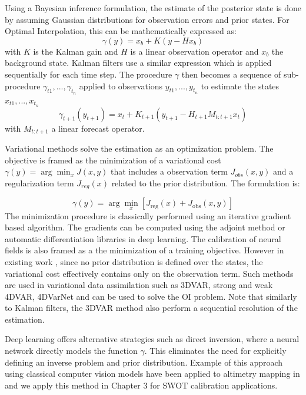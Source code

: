 \begin{bibunit}
Using a Bayesian inference formulation, the estimate of the posterior state is done by assuming Gaussian distributions for observation errors and prior states. 
For Optimal Interpolation, this can be mathematically expressed as:
 $$\gamma(y)= x_b + K(y - Hx_b)$$
with $K$ is the Kalman gain and $H$ is a linear observation operator and $x_b$ the background state.
Kalman filters use a similar expression which is applied sequentially for each time step.
The procedure $\gamma$ then becomes a sequence of sub-procedure $\gamma_{t1}, ..., \gamma_{t_n}$ applied to observations $y_{t1}, ..., y_{t_n}$ to estimate the states $x_{t1}, ..., x_{t_n}$ 
$$\gamma_{t+1}(y_{t+1})= x_{t} + K_{t+1}(y_{t+1} - H_{t+1}M_{t:t+1}x_{t})$$
 with $M_{t:t+1}$ a linear forecast operator.


Variational methods solve the estimation as an optimization problem. The objective is framed as the minimization of a variational cost $\gamma(y) = \arg\min_x J(x, y)$ that includes a observation term $J_{obs}(x, y)$ and a regularization term  $J_{reg}(x)$ related to the prior distribution. The formulation is:

$$ \gamma(y) = \arg\min_x \left[ J_{\text{reg}}(x) + J_{\text{obs}}(x, y) \right]$$
The minimization procedure is classically performed using an iterative gradient based algorithm\cite{carrassiDataAssimilationGeosciences2018}. The gradients can be computed using the adjoint method\cite{lelloucheCopernicusGlobal122021} or automatic differentiation libraries in deep learning\cite{fabletENDTOENDPHYSICSINFORMEDREPRESENTATION2021}.
The calibration of neural fields is also framed as a the minimization of a training objective. However in existing work \cite{johnsonNeuralFieldsFast2022}, since no prior distribution is defined over the states, the variational cost effectively contains only on the observation term.
Such methods are used in variational data assimilation such as 3DVAR, strong and weak 4DVAR, 4DVarNet and can be used to solve the OI problem. Note that similarly to Kalman filters, the 3DVAR method also perform a sequential resolution of the estimation.


Deep learning offers alternative strategies such as direct inversion, where a neural network directly models the function $\gamma$. This eliminates the need for explicitly defining an inverse problem and prior distribution. Example of this approach using classical computer vision models have been applied to altimetry mapping in \cite{manucharyanDeepLearningApproach2021a} and we apply this method in Chapter 3 for SWOT calibration applications.



\end{bibunit}
